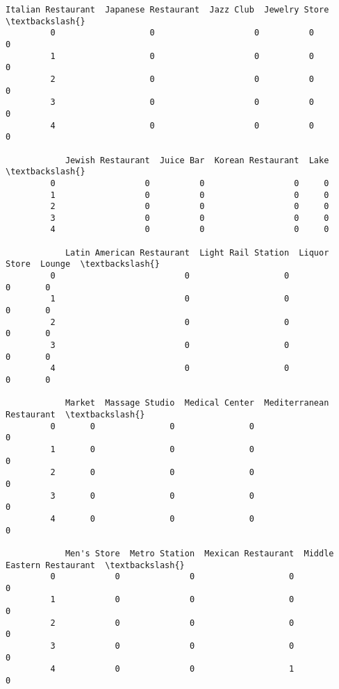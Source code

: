 \documentclass[11pt]{article}
\begin{document}
\begin{Verbatim}[commandchars=\\\{\}]
            Italian Restaurant  Japanese Restaurant  Jazz Club  Jewelry Store  \textbackslash{}
         0                   0                    0          0              0   
         1                   0                    0          0              0   
         2                   0                    0          0              0   
         3                   0                    0          0              0   
         4                   0                    0          0              0   
         
            Jewish Restaurant  Juice Bar  Korean Restaurant  Lake  \textbackslash{}
         0                  0          0                  0     0   
         1                  0          0                  0     0   
         2                  0          0                  0     0   
         3                  0          0                  0     0   
         4                  0          0                  0     0   
         
            Latin American Restaurant  Light Rail Station  Liquor Store  Lounge  \textbackslash{}
         0                          0                   0             0       0   
         1                          0                   0             0       0   
         2                          0                   0             0       0   
         3                          0                   0             0       0   
         4                          0                   0             0       0   
         
            Market  Massage Studio  Medical Center  Mediterranean Restaurant  \textbackslash{}
         0       0               0               0                         0   
         1       0               0               0                         0   
         2       0               0               0                         0   
         3       0               0               0                         0   
         4       0               0               0                         0   
         
            Men's Store  Metro Station  Mexican Restaurant  Middle Eastern Restaurant  \textbackslash{}
         0            0              0                   0                          0   
         1            0              0                   0                          0   
         2            0              0                   0                          0   
         3            0              0                   0                          0   
         4            0              0                   1                          0   
         

\end{Verbatim}
\end{document}
